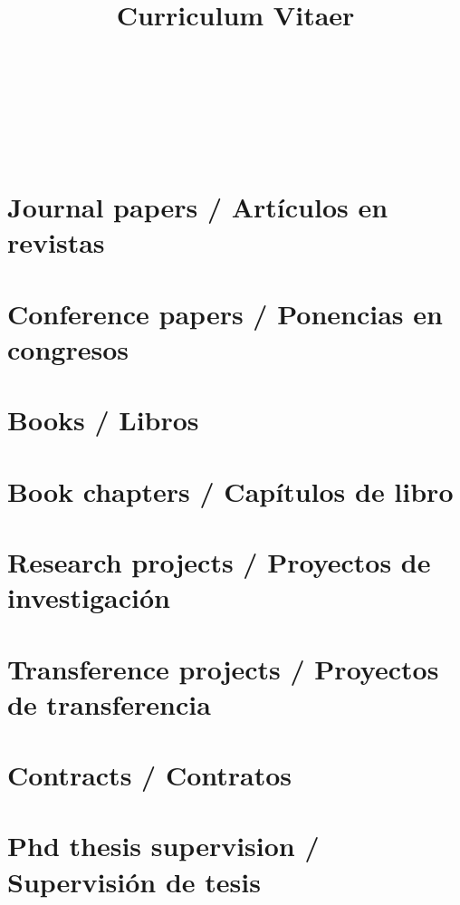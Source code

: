 \documentclass{article}
\title{Curriculum Vitaer}
\author{
  \begin{tabular}{c}
      \\
    ~\\
     \\
     \\
     \\
    ~\\
     \\
    
  \end{tabular}
}
\begin{document}
\maketitle

\tableofcontents

\renewcommand{\refname}{}
\section{Journal papers / Artículos en revistas}


\renewcommand{\refname}{}
\section{Conference papers / Ponencias en congresos}


\renewcommand{\refname}{}
\section{Books / Libros}


\renewcommand{\refname}{}
\section{Book chapters / Capítulos de libro}


\renewcommand{\refname}{}
\section{Research projects / Proyectos de investigación}


\renewcommand{\refname}{}
\section{Transference projects / Proyectos de transferencia}


\renewcommand{\refname}{}
\section{Contracts / Contratos}


\renewcommand{\refname}{}
\section{Phd thesis supervision / Supervisión de tesis}

\end{document}
